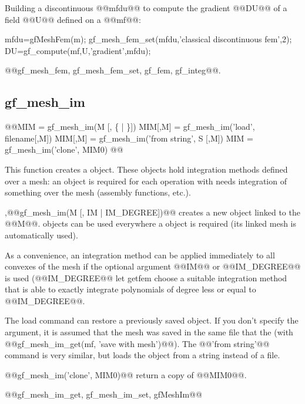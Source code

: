 \begin{cmdexamples}
  Building a discontinuous \tmf @@mfdu@@ to compute the gradient @@DU@@ of a field @@U@@ defined on a \tmf @@mf@@:
\begin{mcode}
mfdu=gfMeshFem(m);
gf_mesh_fem_set(mfdu,'classical discontinuous fem',2); 
DU=gf_compute(mf,U,'gradient',mfdu);
\end{mcode}
\end{cmdexamples}
\begin{gfseealso}
  @@gf\_mesh\_fem, gf_mesh_fem_set, gf_fem, gf_integ@@.
\end{gfseealso}
\newpage



\subsection{gf\_mesh\_im}
\begin{synopsis}
@@\tmim MIM = gf\_mesh\_im(\tmesh M [, \{ \tinteg | \tint \}])
\tmim MIM[,M] = gf\_mesh\_im('load', \tstr filename[,\tmesh M])
\tmim MIM[,M] = gf\_mesh\_im('from string', \tstr S [,\tmesh M])
\tmim MIM = gf\_mesh\_im('clone', \tmim MIM0)
@@\end{synopsis}
\begin{cmddescription}
  This function creates a \tmim object. These objects hold integration
  methods defined over a mesh: an \tmim object is required for each
  operation with needs integration of something over the mesh
  (assembly functions, etc.).

  \sep{@@gf\_mesh\_im(M [, { \tinteg IM | \tint IM_DEGREE}])@@} creates a new \tmim object linked to the \tmesh @@M@@. \tmim objects can be used everywhere a \tcmesh object is
  required (its linked mesh is automatically used). 

  As a convenience, an integration method can be applied immediately
  to all convexes of the mesh if the optional argument @@IM@@ or
  @@IM_DEGREE@@ is used (@@IM_DEGREE@@ let getfem choose a suitable
  integration method that is able to exactly integrate polynomials of
  degree less or equal to @@IM_DEGREE@@.
  
  The load command can restore a previously saved \tmim object. If you
  don't specify the \tmesh argument, it is assumed that the mesh was
  saved in the same file that the \tmim (with @@gf\_mesh\_im\_get(mf,
  'save with mesh')@@). The @@'from string'@@ command is very similar,
  but loads the object from a string instead of a file.

  @@gf\_mesh\_im('clone', MIM0)@@ return a copy of @@MIM0@@.
\end{cmddescription}
\begin{gfseealso}
  @@gf\_mesh\_im\_get, gf\_mesh\_im\_set, gfMeshIm@@
\end{gfseealso}
\newpage


